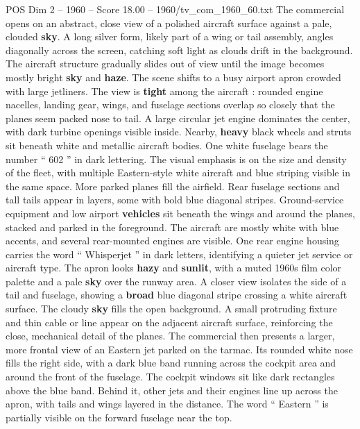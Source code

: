 \begin{textsample}{POS Dim 2 – 1960 – Score 18.00 – 1960/tv\_com\_1960\_60.txt}  \label{ex:f2_pos_011}
The commercial opens on an abstract, close view of a polished aircraft surface against a pale, clouded \textbf{sky}.
A long silver form, likely part of a wing or tail assembly, angles diagonally across the screen, catching soft light as clouds drift in the background.
The aircraft structure gradually slides out of view until the image becomes mostly bright \textbf{sky} and \textbf{haze}.
The scene shifts to a busy airport apron crowded with large jetliners.
The view is \textbf{tight} among the aircraft : rounded engine nacelles, landing gear, wings, and fuselage sections overlap so closely that the planes seem packed nose to tail.
A large circular jet engine dominates the center, with dark turbine openings visible inside.
Nearby, \textbf{heavy} black wheels and struts sit beneath white and metallic aircraft bodies.
One white fuselage bears the number “ 602 ” in dark lettering.
The visual emphasis is on the size and density of the fleet, with multiple Eastern-style white aircraft and blue striping visible in the same space.
More parked planes fill the airfield.
Rear fuselage sections and tall tails appear in layers, some with bold blue diagonal stripes.
Ground-service equipment and low airport \textbf{vehicles} sit beneath the wings and around the planes, stacked and parked in the foreground.
The aircraft are mostly white with blue accents, and several rear-mounted engines are visible.
One rear engine housing carries the word “ Whisperjet ” in dark letters, identifying a quieter jet service or aircraft type.
The apron looks \textbf{hazy} and \textbf{sunlit}, with a muted 1960s film color palette and a pale \textbf{sky} over the runway area.
A closer view isolates the side of a tail and fuselage, showing a \textbf{broad} blue diagonal stripe crossing a white aircraft surface.
The cloudy \textbf{sky} fills the open background.
A small protruding fixture and thin cable or line appear on the adjacent aircraft surface, reinforcing the close, mechanical detail of the planes.
The commercial then presents a larger, more frontal view of an Eastern jet parked on the tarmac.
Its rounded white nose fills the right side, with a dark blue band running across the cockpit area and around the front of the fuselage.
The cockpit windows sit like dark rectangles above the blue band.
Behind it, other jets and their engines line up across the apron, with tails and wings layered in the distance.
The word “ Eastern ” is partially visible on the forward fuselage near the top.

\end{textsample}
